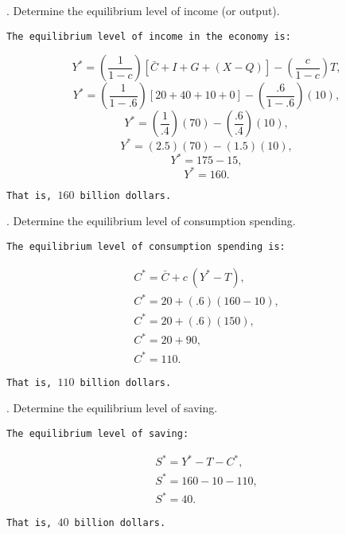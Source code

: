 \documentclass[12pt]{article}
\begin{document}
. Determine the equilibrium level of income (or output). 

\vspace{10pt}


\texttt{The equilibrium level of income in the economy is:}

\[Y^* = \left( \frac{1}{1 - c} \right) [\bar{C} + I + G + (X-Q)] - \left( \frac{c}{1 - c} \right) T,\]
\[Y^* = \left( \frac{1}{1 - .6} \right) [20 + 40 + 10 + 0] - \left( \frac{.6}{1 - .6} \right) (10),\]
\[Y^* = \left( \frac{1}{.4} \right) (70) - \left( \frac{.6}{.4} \right) (10), \]
\[Y^* = \left( 2.5 \right) (70) - \left( 1.5 \right) (10), \]
\[Y^* = 175 - 15, \]
\[Y^* = 160.\]

\texttt{That is, $160$ billion dollars.}

\vspace{12pt}

. Determine the equilibrium level of consumption spending. 

\vspace{10pt}

\texttt{The equilibrium level of consumption spending is:}

\begin{eqnarray}
C^* = \bar{C} + c \ (Y^* - T), \nonumber \\
C^* = 20 + (.6) (160-10), \nonumber \\
C^* = 20 + (.6) (150), \nonumber \\
C^* = 20 + 90, \nonumber \\
C^* = 110. \nonumber 
\end{eqnarray}

\texttt{That is, $110$ billion dollars.}

\vspace{12pt}

. Determine the equilibrium level of saving. 

\vspace{10pt}

\texttt{The equilibrium level of saving:}

\begin{eqnarray}
S^* = Y^* - T - C^*, \nonumber \\
S^* = 160 - 10 - 110, \nonumber \\
S^* = 40. \nonumber 
\end{eqnarray}

\texttt{That is, $40$ billion dollars.}

\vspace{12pt}
\end{document}
